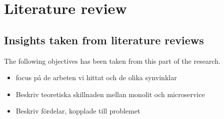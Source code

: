 \chapter{Literature review}

\section{Insights taken from literature reviews}

The following objectives has been taken from this part of the research.
\begin{itemize}
\item focus på de arbeten vi hittat och de olika synvinklar
\item Beskriv teoretiska skillnaden mellan monolit och microservice
\item Beskriv fördelar, kopplade till problemet\cite{VaishnaviDESIGNSYSTEMS}
\end{itemize}